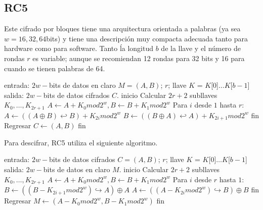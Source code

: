 \subsection{RC5}
Este cifrado por bloques tiene una arquitectura orientada a palabras (ya 
sea $w = 16, 32, 64$bits) y tiene una descripción muy compacta adecuada 
tanto para hardware como para software. Tanto ĺa longitud $b$ de la 
llave y el número de rondas $r$ es variable; aunque se recomiendan 12 
rondas para 32 bits y 16 para cuando se tienen palabras de 64.

\begin{pseudocodigo}[caption={RC5, cifrado.}, label={rc5:1}]
  entrada:	$2w-$bits de datos en claro $M = (A, B)$; $r$; 
  		llave $K$ = $K$[0]$\dots K$[$b-1$] 
  salida: 	$2w-$bits de datos cifrados $C$.
  inicio
    Calcular $2r + 2$ subllaves $K_0, \dots, K_{2r+1}$
    $A \leftarrow A + K_0 mod 2^w, B \leftarrow B + K_1 mod 2^w$
    Para $i$ desde $1$ hasta $r$:
    	$A \leftarrow ((A \oplus B) \hookleftarrow B) + K_{2i} mod 2^w$
    	$B \leftarrow ((B \oplus A) \hookleftarrow A) + K_{2i+1} mod 2^w$ 
    fin
    Regresar $C \leftarrow (A,B)$
  fin
\end{pseudocodigo}

Para descifrar, RC5 utiliza el siguiente algoritmo.
\begin{pseudocodigo}[caption={RC5, descifrado.}, label={rc5:2}]
  entrada:  $2w-$bits de datos cifrados $C = (A, B)$; $r$; 
      llave $K$ = $K$[0]$\dots K$[$b-1$] 
  salida:   $2w-$bits de datos en claro $M$.
  inicio
    Calcular $2r + 2$ subllaves $K_0, \dots, K_{2r+1}$
    $A \leftarrow A + K_0 mod 2^w, B \leftarrow B + K_1 mod 2^w$
    Para $i$ desde $r$ hasta $1$:
      $B \leftarrow ((B - K_{2i+1} mod 2^w) \hookrightarrow A) \oplus A$
      $A \leftarrow ((A - K_{2i} mod 2^w) \hookrightarrow B) \oplus B$
    fin
    Regresar $M \leftarrow (A-K_0 mod 2^w, B-K_1 mod 2^w)$
  fin
\end{pseudocodigo}

